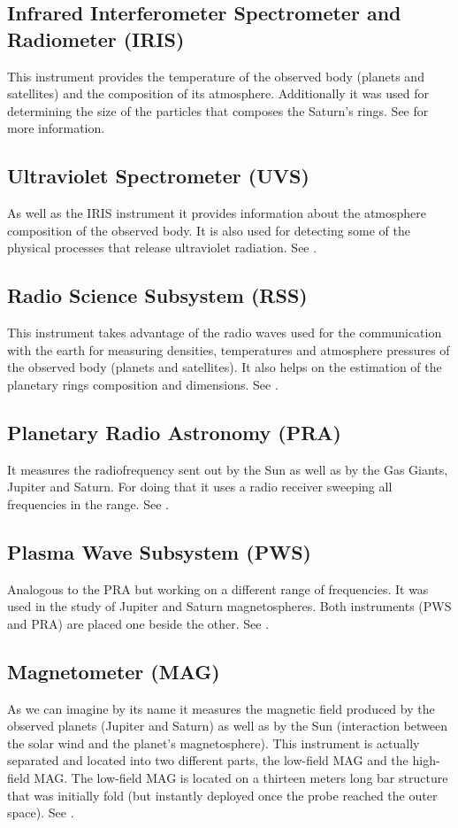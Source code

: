 \documentclass[11pt,a4paper]{article}
\begin{document}
\subsection{Infrared Interferometer Spectrometer and Radiometer (IRIS)}
This instrument provides the temperature of the observed body (planets and satellites) and the composition of its atmosphere. Additionally it was used for determining the size of the particles that composes the Saturn’s rings. See \cite{IRIS} for more information.

\subsection{Ultraviolet Spectrometer (UVS)}
As well as the IRIS instrument it provides information about the atmosphere composition of the observed body. It is also used for detecting some of the physical processes that release ultraviolet radiation. See \cite{UVS}.

\subsection{Radio Science Subsystem (RSS)}
This instrument takes advantage of the radio waves used for the communication with the earth for measuring densities, temperatures and atmosphere pressures of the observed body (planets and satellites). It also helps on the estimation of the planetary rings composition and dimensions. See \cite{RSS}.

\subsection{Planetary Radio Astronomy (PRA)}
It measures the radiofrequency sent out by the Sun as well as by the Gas Giants, Jupiter and Saturn. For doing that it uses a radio receiver sweeping all frequencies in the range. See \cite{PRA}.
\subsection{Plasma Wave Subsystem (PWS)}
Analogous to the PRA but working on a different range of frequencies. It was used in the study of Jupiter and Saturn magnetospheres. Both instruments (PWS and PRA) are placed one beside the other. See \cite{PWS}.

\subsection{Magnetometer (MAG)}
As we can imagine by its name it measures the magnetic field produced by the observed planets (Jupiter and Saturn) as well as by the Sun (interaction between the solar wind and the planet's magnetosphere). This instrument is actually separated and located into two different parts, the low-field MAG and the high-field MAG. The low-field MAG is located on a thirteen meters long bar structure that was initially fold (but instantly deployed once the probe reached the outer space). See \cite{MAG}.
\end{document}
